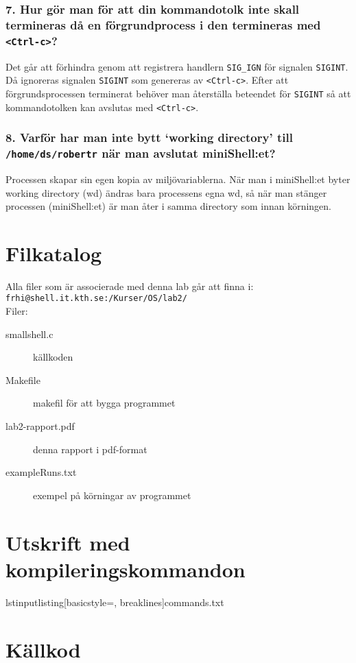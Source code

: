 \documentclass[a4paper]{article}
\begin{document}
\subsubsection*{7. Hur gör man för att din kommandotolk inte skall termineras då en förgrundprocess i den termineras med \texttt{<Ctrl-c>}?}
Det går att förhindra genom att registrera handlern \texttt{SIG\_IGN} för signalen \texttt{SIGINT}. Då ignoreras signalen \texttt{SIGINT} som genereras av \texttt{<Ctrl-c>}. Efter att förgrundsprocessen terminerat behöver man återställa beteendet för \texttt{SIGINT} så att kommandotolken kan avslutas med \texttt{<Ctrl-c>}.

\subsubsection*{8. Varför har man inte bytt `working directory' till \texttt{/home/ds/robertr} när man avslutat miniShell:et?}
Processen skapar sin egen kopia av miljövariablerna. När man i miniShell:et byter working directory (wd) ändras bara processens egna wd, så när man stänger processen (miniShell:et) är man åter i samma directory som innan körningen.

\section*{Filkatalog}
Alla filer som är associerade med denna lab går att finna i:\\
\texttt{frhi@shell.it.kth.se:/Kurser/OS/lab2/}
\\
Filer:
\begin{description}
\item[smallshell.c] källkoden
\item[Makefile] makefil för att bygga programmet
\item[lab2-rapport.pdf] denna rapport i pdf-format
\item[exampleRuns.txt] exempel på körningar av programmet
\end{description}

\section*{Utskrift med kompileringskommandon}
lstinputlisting[basicstyle=\footnotesize, breaklines]{commands.txt}

\section*{Källkod}

\end{document}
